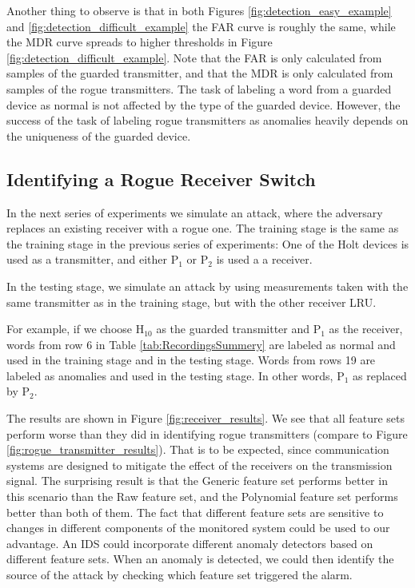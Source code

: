 \documentclass[compsoc,conference,a4paper,10pt,times]{IEEEtran}
\newcommand{\sublevel}[1]{\subsection{#1}}
\newcommand{\sublevel}[1]{\section{#1}}
\begin{document}
  Another thing to observe is that in both Figures \ref{fig:detection_easy_example} and \ref{fig:detection_difficult_example} the FAR curve is roughly the same, while the MDR curve spreads to higher thresholds in Figure \ref{fig:detection_difficult_example}. Note that the FAR is only calculated from samples of the guarded transmitter, and that the MDR is only calculated from samples of the rogue transmitters. The task of labeling a word from a guarded device as normal is not affected by the type of the guarded device. However, the success of the task of labeling rogue transmitters as anomalies heavily depends on the uniqueness of the guarded device.
  
\sublevel{Identifying a Rogue Receiver Switch}
  In the next series of experiments we simulate an attack, where the adversary replaces an existing receiver with a rogue one. The training stage is the same as the training stage in the previous series of experiments: One of the Holt devices is used as a transmitter, and either \(\text{P}_1\) or \(\text{P}_2\) is used a a receiver.
  
  In the testing stage, we simulate an attack by using measurements taken with the same transmitter as in the training stage, but with the other receiver LRU.
  
  For example, if we choose \(\text{H}_{10}\) as the guarded transmitter and \(\text{P}_1\) as the receiver, words from row 6 in Table \ref{tab:RecordingsSummery} are labeled as normal and used in the training stage and in the testing stage. Words from rows 19 are labeled as anomalies and used in the testing stage. In other words, \(\text{P}_1\) as replaced by \(\text{P}_2\).
  
  The results are shown in Figure \ref{fig:receiver_results}. We see that all feature sets perform worse than they did in identifying rogue transmitters (compare to Figure \ref{fig:rogue_transmitter_results}). That is to be expected, since communication systems are designed to mitigate the effect of the receivers on the transmission signal. The surprising result is that the Generic feature set performs better in this scenario than the Raw feature set, and the Polynomial feature set performs better than both of them. The fact that different feature sets are sensitive to changes in different components of the monitored system could be used to our advantage. An IDS could incorporate different anomaly detectors based on different feature sets. When an anomaly is detected, we could then identify the source of the attack by checking which feature set triggered the alarm.
  
\end{document}
